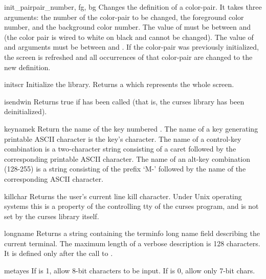 \begin{funcdesc}{init_pair}{pair_number, fg, bg}
Changes the definition of a color-pair.  It takes three arguments: the
number of the color-pair to be changed, the foreground color number,
and the background color number.  The value of  must
be between  and  (the  color
pair is wired to white on black and cannot be changed).  The value of
 and  arguments must be between  and
.  If the color-pair was previously initialized, the
screen is refreshed and all occurrences of that color-pair are changed
to the new definition.
\end{funcdesc}

\begin{funcdesc}{initscr}{}
Initialize the library. Returns a  which represents
the whole screen.
\end{funcdesc}

\begin{funcdesc}{isendwin}{}
Returns true if  has been called (that is, the 
curses library has been deinitialized).
\end{funcdesc}

\begin{funcdesc}{keyname}{k}
Return the name of the key numbered .  The name of a key
generating printable ASCII character is the key's character.  The name
of a control-key combination is a two-character string consisting of a
caret followed by the corresponding printable ASCII character.  The
name of an alt-key combination (128-255) is a string consisting of the
prefix `M-' followed by the name of the corresponding ASCII character.
\end{funcdesc}

\begin{funcdesc}{killchar}{}
Returns the user's current line kill character. Under Unix operating
systems this is a property of the controlling tty of the curses
program, and is not set by the curses library itself.
\end{funcdesc}

\begin{funcdesc}{longname}{}
Returns a string containing the terminfo long name field describing the current
terminal.  The maximum length of a verbose description is 128
characters.  It is defined only after the call to
.
\end{funcdesc}

\begin{funcdesc}{meta}{yes}
If  is 1, allow 8-bit characters to be input. If  is 0, 
allow only 7-bit chars.
\end{funcdesc}

